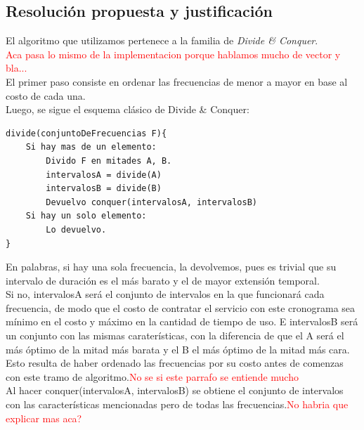 \newpage

\subsection{Resoluci\'on propuesta y justificaci\'on}

El algoritmo que utilizamos pertenece a la familia de \emph{Divide \& Conquer}.\\

\textcolor{red}{Aca pasa lo mismo de la implementacion porque hablamos mucho de vector y bla...}\\

El primer paso consiste en ordenar las frecuencias de menor a mayor en base al costo de cada una.\\

Luego, se sigue el esquema cl\'asico de Divide \& Conquer:\\

	\begin{codesnippet}
	\begin{verbatim}
divide(conjuntoDeFrecuencias F){
    Si hay mas de un elemento:
        Divido F en mitades A, B.
        intervalosA = divide(A)
        intervalosB = divide(B)
        Devuelvo conquer(intervalosA, intervalosB)
    Si hay un solo elemento:
        Lo devuelvo.	
}
	\end{verbatim}
	\end{codesnippet}

En palabras, si hay una sola frecuencia, la devolvemos, pues es trivial que su intervalo de duraci\'on es el m\'as barato y el de mayor extensi\'on temporal.\\

Si no, intervalosA ser\'a el conjunto de intervalos en la que funcionar\'a cada frecuencia, de modo que el costo de contratar el servicio con este cronograma sea m\'inimo en el costo y m\'aximo en la cantidad de tiempo de uso. E intervalosB ser\'a un conjunto con las mismas carater\'isticas, con la diferencia de que el A ser\'a el m\'as \'optimo de la mitad m\'as barata y el B el m\'as \'optimo de la mitad m\'as cara. Esto resulta de haber ordenado las frecuencias por su costo antes de comenzas con este tramo de algoritmo.\textcolor{red}{No se si este parrafo se entiende mucho}\\

Al hacer conquer(intervalosA, intervalosB) se obtiene el conjunto de intervalos con las caracter\'isticas mencionadas pero de todas las frecuencias.\textcolor{red}{No habria que explicar mas aca?}\\


